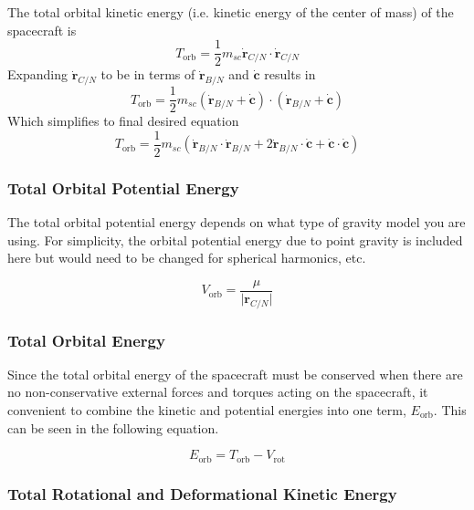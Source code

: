 The total orbital kinetic energy (i.e. kinetic energy of the center of mass) of the spacecraft is
\begin{equation}
T_{\text{orb}} = \frac{1}{2} m_{sc} \dot{\bm r}_{C/N} \cdot \dot{\bm r}_{C/N}
\end{equation}
Expanding $\dot{\bm r}_{C/N}$ to be in terms of $\dot{\bm r}_{B/N}$ and $\dot{\bm c}$ results in
\begin{equation}
T_{\text{orb}} = \frac{1}{2} m_{sc} (\dot{\bm r}_{B/N} + \dot{\bm c}) \cdot (\dot{\bm r}_{B/N} + \dot{\bm c})
\end{equation}
Which simplifies to final desired equation
\begin{equation}
T_{\text{orb}} = \frac{1}{2} m_{sc} (\dot{\bm r}_{B/N}\cdot \dot{\bm r}_{B/N} + 2 \dot{\bm r}_{B/N} \cdot \dot{\bm c} + \dot{\bm c} \cdot \dot{\bm c})
\end{equation}

\subsubsection{Total Orbital Potential Energy}

The total orbital potential energy depends on what type of gravity model you are using. For simplicity, the orbital potential energy due to point gravity is included here but would need to be changed for spherical harmonics, etc. 

\begin{equation}
V_{\text{orb}} = \frac{\mu}{\vert \bm r_{C/N} \vert}
\end{equation}

\subsubsection{Total Orbital Energy}

Since the total orbital energy of the spacecraft must be conserved when there are no non-conservative external forces and torques acting on the spacecraft, it convenient to combine the kinetic and potential energies into one term, $E_{\text{orb}}$. This can be seen in the following equation.

\begin{equation}
E_{\text{orb}} = T_{\text{orb}} - V_{\text{rot}}
\end{equation}

\subsubsection{Total Rotational and Deformational Kinetic Energy}

